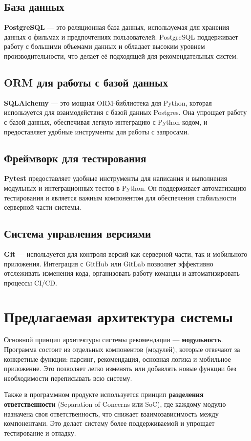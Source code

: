 \subsection{База данных}
\textbf{PostgreSQL} — это реляционная база данных, используемая для хранения данных о фильмах и предпочтениях пользователей. PostgreSQL поддерживает работу с большими объемами данных и обладает высоким уровнем производительности, что делает её подходящей для рекомендательных систем.

\subsection{ORM для работы с базой данных}
\textbf{SQLAlchemy} — это мощная ORM-библиотека для Python, которая используется для взаимодействия с базой данных Postgres. Она упрощает работу с базой данных, обеспечивая легкую интеграцию с Python-кодом, и предоставляет удобные инструменты для работы с запросами.

\subsection{Фреймворк для тестирования}
\textbf{Pytest} предоставляет удобные инструменты для написания и выполнения модульных и интеграционных тестов в Python. Он поддерживает автоматизацию тестирования и является важным компонентом для обеспечения стабильности серверной части системы.

\subsection{Система управления версиями}
\textbf{Git} — используется для контроля версий как серверной части, так и мобильного приложения. Интеграция с GitHub или GitLab позволяет эффективно отслеживать изменения кода, организовать работу команды и автоматизировать процессы CI/CD.


\section{Предлагаемая архитектура системы}

Основной принцип архитектуры системы рекомендации
--- \textbf{модульность}.
Программа состоит из отдельных компонентов (модулей),
которые отвечают за конкретные функции:
парсинг, рекомендация, основная логика и мобильное приложение.
Это позволяет легко изменять или добавлять новые функции
без необходимости переписывать всю систему.\par
Также в программном продукте используется принцип
\textbf{разделения ответственности}
(Separation of Concerns или SoC), где каждому модулю назначена
своя ответственность, что снижает взаимозависимость между компонентами.
Это делает систему более поддерживаемой и упрощает тестирование и отладку.

